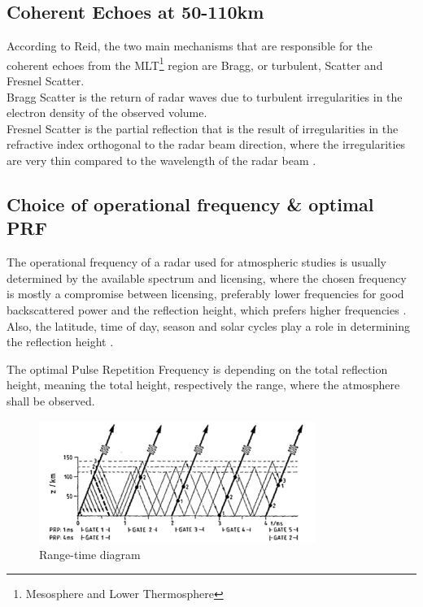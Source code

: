 \subsection{Coherent Echoes at 50-110km}
According to Reid, the two main mechanisms that are responsible for the coherent echoes from the MLT\footnote{Mesosphere and Lower Thermosphere} region are Bragg, or turbulent, Scatter and Fresnel Scatter. \\
Bragg Scatter is the return of radar waves due to turbulent irregularities in the electron density of the observed volume. \\
Fresnel Scatter is the partial reflection that is the result of irregularities in the refractive index orthogonal to the radar beam direction, where the irregularities are very thin compared to the wavelength of the radar beam \citep{reid2015mf}.

\subsection{Choice of operational frequency \& optimal PRF}

The operational frequency of a radar used for atmospheric studies is usually determined by the available spectrum and licensing, where the chosen frequency is mostly a compromise between licensing, preferably lower frequencies for good backscattered power and the reflection height, which prefers higher frequencies \citep{reid2015mf}. Also, the latitude, time of day, season and solar cycles play a role in determining the reflection height \citep{jursa1985handbook}.

The optimal Pulse Repetition Frequency is depending on the total reflection height, meaning the total height, respectively the range, where the atmosphere shall be observed.
\begin{figure}[h]
	\centering
	\includegraphics[width=0.8\textwidth]{images/maxPRF}	
	\caption{Range-time diagram \citep[c.f.][Fig. 5]{reid2015mf} }
\end{figure}


